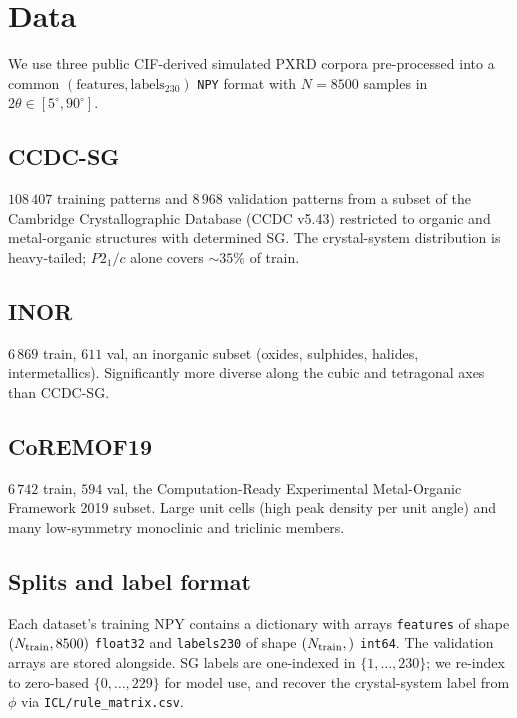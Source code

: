 \documentclass[final]{ws-ijwmip}
\begin{document}


\section{Data}
\label{sec:data}

We use three public CIF-derived simulated PXRD corpora pre-processed
into a common $(\mathrm{features},\mathrm{labels}_{230})$
\texttt{NPY} format with $N=8500$ samples in $2\theta\!\in\![5^\circ,90^\circ]$.


\subsection{CCDC-SG}

$108\,407$ training patterns and $8\,968$ validation patterns from a
subset of the Cambridge Crystallographic Database (CCDC v5.43)
restricted to organic and metal-organic structures with determined SG.
The crystal-system distribution is heavy-tailed; $P2_1/c$ alone covers
$\sim 35\%$ of train.


\subsection{INOR}

$6\,869$ train, $611$ val, an inorganic subset
(oxides, sulphides, halides, intermetallics). Significantly more diverse
along the cubic and tetragonal axes than CCDC-SG.


\subsection{CoREMOF19}

$6\,742$ train, $594$ val, the
Computation-Ready Experimental Metal-Organic Framework 2019 subset.
Large unit cells (high peak density per unit angle) and many
low-symmetry monoclinic and triclinic members.


\subsection{Splits and label format}

Each dataset's training NPY contains a dictionary with arrays
\texttt{features} of shape $(N_{\rm train}, 8500)$ \texttt{float32} and
\texttt{labels230} of shape $(N_{\rm train},)$ \texttt{int64}. The
validation arrays are stored alongside. SG labels are one-indexed in
$\{1,\dots,230\}$; we re-index to zero-based $\{0,\dots,229\}$ for model
use, and recover the crystal-system label from $\phi$ via
\texttt{ICL/rule\_matrix.csv}.
\end{document}

